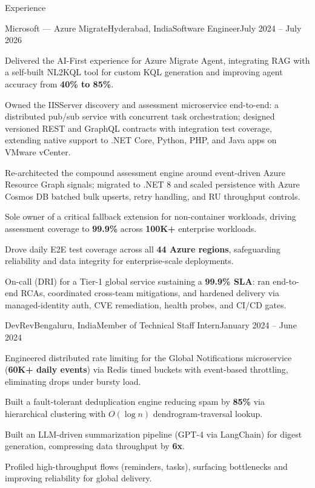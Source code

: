 
\begin{rSection}{Experience}

    \begin{rSubsection}{Microsoft --- Azure Migrate}{Hyderabad, India}{Software Engineer}{July 2024 -- July 2026}
        \item Delivered the AI-First experience for Azure Migrate Agent, integrating RAG with a self-built NL2KQL tool for custom KQL generation and improving agent accuracy from \textbf{40\% to 85\%}.
        \item Owned the IISServer discovery and assessment microservice end-to-end: a distributed pub/sub service with concurrent task orchestration; designed versioned REST and GraphQL contracts with integration test coverage, extending native support to .NET Core, Python, PHP, and Java apps on VMware vCenter.
        \item Re-architected the compound assessment engine around event-driven Azure Resource Graph signals; migrated to .NET 8 and scaled persistence with Azure Cosmos DB batched bulk upserts, retry handling, and RU throughput controls.
        \item Sole owner of a critical fallback extension for non-container workloads, driving assessment coverage to \textbf{99.9\%} across \textbf{100K+} enterprise workloads.
        \item Drove daily E2E test coverage across all \textbf{44 Azure regions}, safeguarding reliability and data integrity for enterprise-scale deployments.
        \item On-call (DRI) for a Tier-1 global service sustaining a \textbf{99.9\% SLA}: ran end-to-end RCAs, coordinated cross-team mitigations, and hardened delivery via managed-identity auth, CVE remediation, health probes, and CI/CD gates.
    \end{rSubsection}

    \begin{rSubsection}{DevRev}{Bengaluru, India}{Member of Technical Staff Intern}{January 2024 -- June 2024}
        \item Engineered distributed rate limiting for the Global Notifications microservice (\textbf{60K+ daily events}) via Redis timed buckets with event-based throttling, eliminating drops under bursty load.
        \item Built a fault-tolerant deduplication engine reducing spam by \textbf{85\%} via hierarchical clustering with $O(\log n)$ dendrogram-traversal lookup.
        \item Built an LLM-driven summarization pipeline (GPT-4 via LangChain) for digest generation, compressing data throughput by \textbf{6x}.
        \item Profiled high-throughput flows (reminders, tasks), surfacing bottlenecks and improving reliability for global delivery.
    \end{rSubsection}


\end{rSection}
